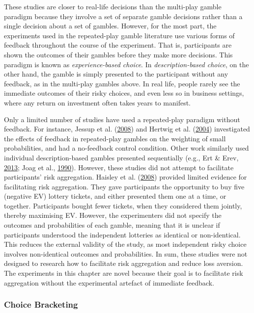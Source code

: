 \documentclass[
  english,
  man, donotrepeattitle,floatsintext]{apa7}
\theoremstyle{definition}
\theoremstyle{definition}
\theoremstyle{definition}
\theoremstyle{definition}
\theoremstyle{remark}
\begin{document}
These studies are closer to real-life decisions than the multi-play gamble
paradigm because they involve a set of separate gamble decisions rather than a
single decision about a set of gambles. However, for the most part, the
experiments used in the repeated-play gamble literature use various forms of
feedback throughout the course of the experiment. That is, participants are
shown the outcomes of their gambles before they make more decisions. This
paradigm is known as \emph{experience-based choice}. In \emph{description-based choice},
on the other hand, the gamble is simply presented to the participant without any
feedback, as in the multi-play gambles above. In real life, people rarely see
the immediate outcomes of their risky choices, and even less so in business
settings, where any return on investment often takes years to manifest.

Only a limited number of studies have used a repeated-play paradigm without
feedback. For instance, Jessup et al. (\protect\hyperlink{ref-jessup2008}{2008}) and Hertwig et al. (\protect\hyperlink{ref-hertwig2004}{2004}) investigated the effects of
feedback in repeated-play gambles on the weighting of small probabilities, and
had a no-feedback control condition. Other work similarly used individual
description-based gambles presented sequentially (e.g., Ert \& Erev, \protect\hyperlink{ref-ert2013}{2013}; Joag et al., \protect\hyperlink{ref-joag1990}{1990}).
However, these studies did not attempt to facilitate participants' risk
aggregation. Haisley et al. (\protect\hyperlink{ref-haisley2008}{2008}) provided limited evidence for facilitating risk
aggregation. They gave participants the opportunity to buy five (negative EV)
lottery tickets, and either presented them one at a time, or together.
Participants bought fewer tickets, when they considered them jointly, thereby
maximising EV. However, the experimenters did not specify the outcomes and
probabilities of each gamble, meaning that it is unclear if participants
understood the independent lotteries as identical or non-identical. This reduces
the external validity of the study, as most independent risky choice involves
non-identical outcomes and probabilities. In sum, these studies were not
designed to research how to facilitate risk aggregation and reduce loss
aversion. The experiments in this chapter are novel because their goal is to
facilitate risk aggregation without the experimental artefact of immediate
feedback.

\hypertarget{choice-bracketing}{%
\subsubsection{Choice Bracketing}\label{choice-bracketing}}
\end{document}

